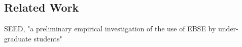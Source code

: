 \subsection{Related Work}
SEED, "a preliminary empirical investigation of the use of EBSE by under-graduate students"